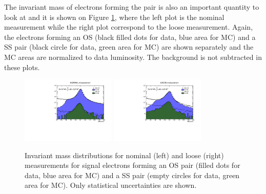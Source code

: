 The invariant mass of electrons forming the pair is also an important quantity to look at and it is shown on Figure \ref{fig:mll}, where the left plot is the nominal measurement while the right plot correspond to the loose measurement. Again, the electrons forming an OS (black filled dots for data, blue area for MC) and a SS pair (black circle for data, green area for MC) are shown separately and the MC areas are normalized to data luminosity. The background is not subtracted in these plots.

\begin{figure}[!htb]
\centering
\includegraphics[width=0.4\textwidth]{FIGURES/BKG/chargeFlip/mll_nominal_v28.pdf}
\includegraphics[width=0.4\textwidth]{FIGURES/BKG/chargeFlip/mll_loose_v28.pdf}
\caption{\label{fig:mll} Invariant mass distributions for nominal (left) and loose (right) measurements for signal electrons forming an OS pair (filled dots for data, blue area for MC) and a SS pair (empty circles for data, green area for MC). Only statistical uncertainties are shown.}
\end{figure}


